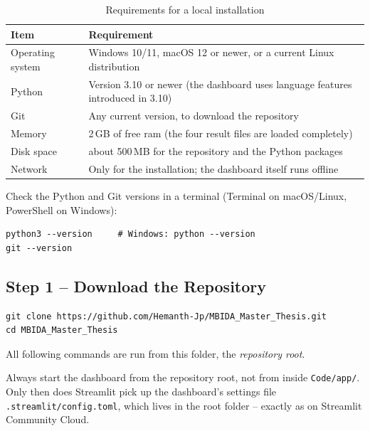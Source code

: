 \begin{table}[H]
\centering
\caption{Requirements for a local installation}
\label{tab:localReq}
\small
\begin{tabularx}{\linewidth}{@{}lX@{}}
\toprule
\textbf{Item} & \textbf{Requirement} \\
\midrule
Operating system & Windows 10/11, macOS 12 or newer, or a current Linux distribution \\
Python & Version 3.10 or newer (the dashboard uses language features introduced in 3.10) \\
Git & Any current version, to download the repository \\
Memory & 2\,GB of free \ac{ram} (the four result files are loaded completely) \\
Disk space & about 500\,MB for the repository and the Python packages \\
Network & Only for the installation; the dashboard itself runs offline \\
\bottomrule
\end{tabularx}
\end{table}

Check the Python and Git versions in a terminal (Terminal on macOS/Linux, PowerShell on Windows):

\begin{lstlisting}[style=shell]
python3 --version     # Windows: python --version
git --version
\end{lstlisting}

\subsection{Step 1 -- Download the Repository}

\begin{lstlisting}[style=shell]
git clone https://github.com/Hemanth-Jp/MBIDA_Master_Thesis.git
cd MBIDA_Master_Thesis
\end{lstlisting}

All following commands are run from this folder, the \emph{repository root}.

\begin{WarningBox}
Always start the dashboard from the repository root, not from inside \texttt{Code/app/}. Only then does Streamlit pick up the dashboard's settings file \texttt{.streamlit/config.toml}, which lives in the root folder -- exactly as on Streamlit Community Cloud.
\end{WarningBox}

